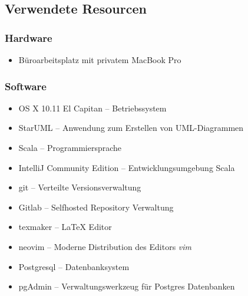 \subsection{Verwendete Resourcen}
\label{app:Ressourcen}

\subsubsection{Hardware}

\begin{itemize}
	\item Büroarbeitsplatz mit privatem MacBook Pro
\end{itemize}

\subsubsection{Software}

\begin{itemize}
	\item OS X 10.11 El Capitan – Betriebssystem
	\item StarUML – Anwendung zum Erstellen von \acs{UML}-Diagrammen
	\item Scala – Programmiersprache
	\item IntelliJ Community Edition – Entwicklungsumgebung Scala
	\item git – Verteilte Versionsverwaltung
	\item Gitlab – Selfhosted Repository Verwaltung
	\item texmaker – \LaTeX\xspace Editor
	\item neovim – Moderne Distribution des Editors \textit{vim}
	\item Postgresql – Datenbanksystem
	\item pgAdmin – Verwaltungswerkzeug für Postgres Datenbanken
\end{itemize}